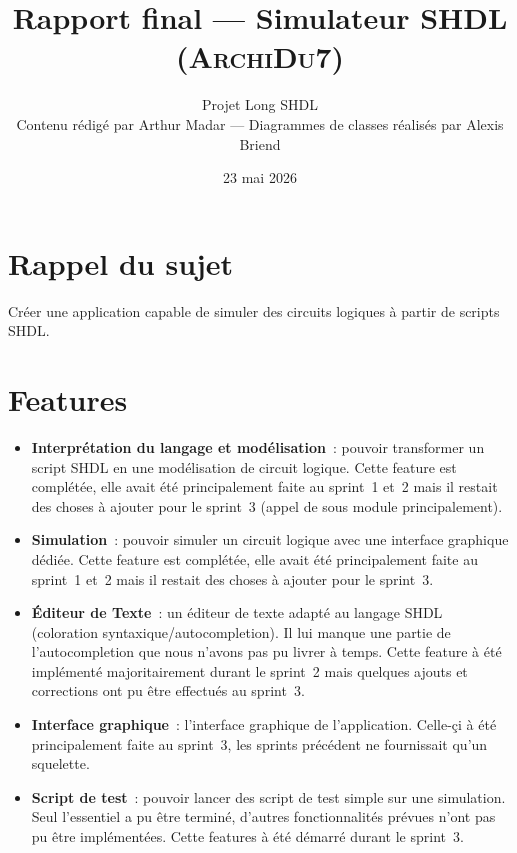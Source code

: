 \documentclass[11pt,a4paper]{article}
\title{\vspace{-1.5cm}Rapport final --- Simulateur SHDL (\textsc{ArchiDu7})}
\author{Projet Long SHDL\\[0.4em]
\normalsize Contenu rédigé par Arthur Madar \quad{}---\quad{} Diagrammes de classes réalisés par Alexis Briend}
\date{23 mai 2026}
\begin{document}
\maketitle
\vspace{-2em}

\section*{Rappel du sujet}
Créer une application capable de simuler des circuits logiques à partir de scripts SHDL.

\section*{Features}
\begin{itemize}
  \item \textbf{Interprétation du langage et modélisation}~: pouvoir transformer un script SHDL en une modélisation de circuit logique. Cette feature est complétée, elle avait été principalement faite au sprint~1 et~2 mais il restait des choses à ajouter pour le sprint~3 (appel de sous module principalement).
  \item \textbf{Simulation}~: pouvoir simuler un circuit logique avec une interface graphique dédiée. Cette feature est complétée, elle avait été principalement faite au sprint~1 et~2 mais il restait des choses à ajouter pour le sprint~3.
  \item \textbf{Éditeur de Texte}~: un éditeur de texte adapté au langage SHDL (coloration syntaxique/autocompletion). Il lui manque une partie de l'autocompletion que nous n'avons pas pu livrer à temps. Cette feature à été implémenté majoritairement durant le sprint~2 mais quelques ajouts et corrections ont pu être effectués au sprint~3.
  \item \textbf{Interface graphique}~: l'interface graphique de l'application. Celle-çi à été principalement faite au sprint~3, les sprints précédent ne fournissait qu'un squelette.
  \item \textbf{Script de test}~: pouvoir lancer des script de test simple sur une simulation. Seul l'essentiel a pu être terminé, d'autres fonctionnalités prévues n'ont pas pu être implémentées. Cette features à été démarré durant le sprint~3.
\end{itemize}
\end{document}
